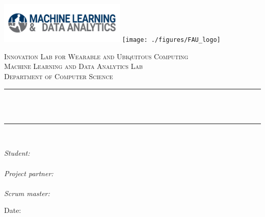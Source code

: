 \begin{titlepage}

\newcommand{\HRule}{\rule{\linewidth}{0.5mm}} %



\includegraphics[width = 6cm]{./figures/cropped-logo_mad-1024x182.png} 
\hspace{3cm}
\texttt{[image: ./figures/FAU\_logo]}\\[0.5cm] 

\begin{center} %

\textsc{\LARGE Innovation Lab for Wearable and Ubiquitous Computing}\\[1 cm] 
\textsc{\Large Machine Learning and Data Analytics Lab}\\[0.5cm] 
\textsc{\large Department of Computer Science}\\[0.5cm] 

\HRule \\[0.4cm]
{ \huge \bfseries \reporttitle}\\ %
\HRule \\[1.5cm]
\end{center}

\begin{flushleft} \large
\textit{Student:}\\
\reportauthor \\%
\vspace{1cm}
\textit{Project partner:}\\
\projectpartner\\ %
\vspace{1cm}
\textit{Scrum master:} \\ %
\scrummaster
\end{flushleft}
\vspace{1cm}
\makeatletter
Date: \@date 

\vfill %



\makeatother


\end{titlepage}

